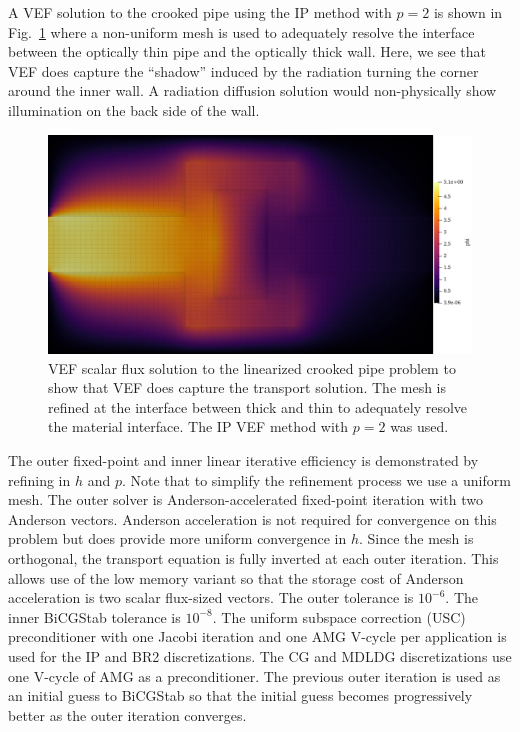 \documentclass[../doc.tex]{subfiles}
\begin{document}
A VEF solution to the crooked pipe using the IP method with $p=2$ is shown in Fig.~\ref{dgvef:cp_sol} where a non-uniform mesh is used to adequately resolve the interface between the optically thin pipe and the optically thick wall. Here, we see that VEF does capture the ``shadow'' induced by the radiation turning the corner around the inner wall. A radiation diffusion solution would non-physically show illumination on the back side of the wall.
\begin{figure}
\centering
\includegraphics[width=.65\textwidth]{data/img/cp.png}
\caption{VEF scalar flux solution to the linearized crooked pipe problem to show that VEF does capture the transport solution. The mesh is refined at the interface between thick and thin to adequately resolve the material interface. The IP VEF method with $p=2$ was used.}
\label{dgvef:cp_sol}
\end{figure}

The outer fixed-point and inner linear iterative efficiency is demonstrated by refining in $h$ and $p$. Note that to simplify the refinement process we use a uniform mesh. The outer solver is Anderson-accelerated fixed-point iteration with two Anderson vectors. Anderson acceleration is not required for convergence on this problem but does provide more uniform convergence in $h$. Since the mesh is orthogonal, the transport equation is fully inverted at each outer iteration. This allows use of the low memory variant so that the storage cost of Anderson acceleration is two scalar flux-sized vectors. The outer tolerance is $10^{-6}$. The inner BiCGStab tolerance is $10^{-8}$. The uniform subspace correction (USC) preconditioner with one Jacobi iteration and one AMG V-cycle per application is used for the IP and BR2 discretizations. The CG and MDLDG discretizations use one V-cycle of AMG as a preconditioner. The previous outer iteration is used as an initial guess to BiCGStab so that the initial guess becomes progressively better as the outer iteration converges. 
\end{document}
